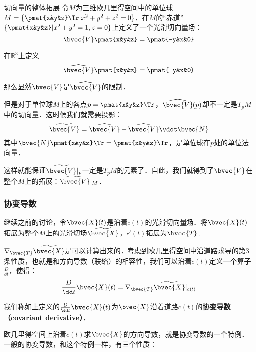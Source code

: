 \begin{example}{切向量的整体拓展}
令$M$为三维欧几里得空间中的单位球$M=\{\pmat{x&y&z}\Tr|x^2+y^2+z^2=0\}$．在$M$的“赤道”$\{\pmat{x&y&z}|x^2+y^2=1, z=0\}$上定义了一个光滑切向量场：
\begin{equation}
\bvec{V}\pmat{x&y&z}=\pmat{-y&x&0}
\end{equation}

在$\mathbb{R}^3$上定义
\begin{equation}
\widehat{\bvec{V}}\pmat{x&y&z}=\pmat{-y&x&0}
\end{equation}

那么显然$\bvec{V}$是$\widehat{\bvec{V}}$的限制．

但是对于单位球$M$上的各点$p=\pmat{x&y&z}\Tr$，$\widehat{\bvec{V}}(p)$却不一定是$T_pM$中的切向量．这时候我们就需要投影：
\begin{equation}
\widetilde{\bvec{V}}=\widehat{\bvec{V}}-\widehat{\bvec{V}}\vdot\bvec{N}
\end{equation}
其中$\bvec{N}\pmat{x&y&z}\Tr=\pmat{x&y&z}\Tr$，是单位球在$p$处的单位法向量．

这样就能保证$\widetilde{\bvec{V}}|_p$一定是$T_pM$的元素了．自此，我们就得到了$\bvec{V}$在整个$M$上的拓展：$\widetilde{\bvec{V}}|_{M}$．

\end{example}

\subsubsection{协变导数}

继续之前的讨论，令$\bvec{X}(t)$是沿着$c(t)$的光滑切向量场．将$\bvec{X}(t)$拓展为整个$M$上的光滑切场$\widetilde{\bvec{X}}$，$c'(t)$拓展为$\bvec{T}$．

$\nabla_{\bvec{T}}\widetilde{\bvec{X}}$是可以计算出来的．考虑到欧几里得空间中沿道路求导的第3条性质，也就是和方向导数（联络）的相容性，我们可以沿着$c(t)$定义一个算子$\frac{D}{\dd t}$，使得：
\begin{equation}
\frac{D}{\dd t}\bvec{X}(t)=\nabla_{\bvec{T}}\widetilde{\bvec{X}}|_{c(t)}
\end{equation}

我们称如上定义的$\frac{D}{\dd t}\bvec{X}(t)$为$\bvec{X}$沿着道路$c(t)$的\textbf{协变导数（covariant derivative）}．

欧几里得空间上沿着$c(t)$求$\bvec{X}$的方向导数，就是协变导数的一个特例．一般的协变导数，和这个特例一样，有三个性质：


